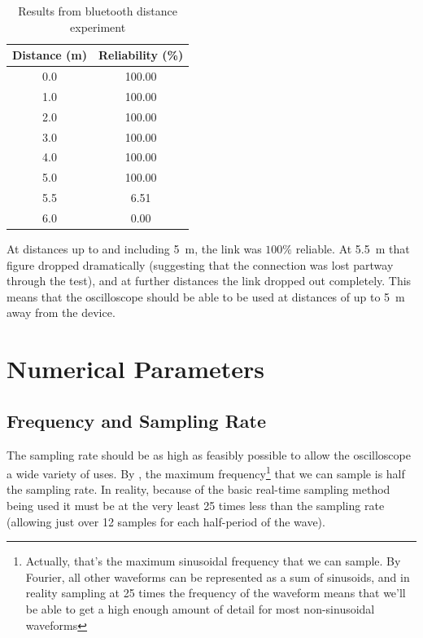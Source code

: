 \begin{table}
  \centering
  \begin{tabular}{SS}
    \toprule
    {Distance (\si{m})} & {Reliability (\%)}\\
    \midrule

    0.0 & 100.00\\
    1.0 & 100.00\\
    2.0 & 100.00\\
    3.0 & 100.00\\
    4.0 & 100.00\\
    5.0 & 100.00\\
    5.5 & 6.51\\
    6.0 & 0.00\\

    \bottomrule
  \end{tabular}
  \caption{Results from bluetooth distance experiment}
  \label{tab:bluetoothData}
\end{table}

At distances up to and including \SI{5}{\m}, the link was $100\%$
reliable. At \SI{5.5}{\m} that figure dropped dramatically (suggesting that the
connection was lost partway through the test), and at further distances the link
dropped out completely. This means that the oscilloscope should be able to be
used at distances of up to \SI{5}{\m} away from the device.


\section{Numerical Parameters}

\subsection*{Frequency and Sampling Rate}

The sampling rate should be as high as feasibly possible to allow the
oscilloscope a wide variety of uses. By \textcite{ShanonNyquist}, the maximum
frequency\footnote{Actually, that's the maximum sinusoidal frequency that we can
sample. By Fourier, all other waveforms can be represented as a sum of
sinusoids, and in reality sampling at 25 times the frequency of the waveform
means that we'll be able to get a high enough amount of detail for most
non-sinusoidal waveforms} that we can sample is half the sampling rate. In
reality, because of the basic real-time sampling method being used it must be at
the very least 25 times less than the sampling rate (allowing just over 12
samples for each half-period of the wave).

